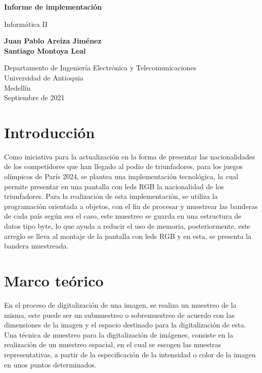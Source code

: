\documentclass{article}
\begin{document}
\begin{titlepage}
    \begin{center}
        \vspace*{1cm}
            
        \Huge
        \textbf{Informe de implementación}
            
        \vspace{0.5cm}
        \LARGE
        Informática II
            
        \vspace{1.5cm}
            
        \textbf{Juan Pablo Areiza Jiménez\\Santiago Montoya Leal}
            
        \vfill
            
        \vspace{0.8cm}
            
        \Large
        Departamento de Ingeniería Electrónica y Telecomunicaciones\\
        Universidad de Antioquia\\
        Medellín\\
        Septiembre de 2021
            
    \end{center}
\end{titlepage}

\tableofcontents
\newpage
\section{Introducción}\label{intro}
Como iniciativa para la actualización en la forma de presentar las nacionalidades de los competidores que han llegado al podio de triunfadores, para los juegos olímpicos de París 2024, se plantea una implementación tecnológica, la cual permite presentar en una pantalla con leds RGB la nacionalidad de los triunfadores. Para la realización de esta implementación, se utiliza la programación orientada a objetos, con el fin de procesar y muestrear las banderas de cada país según sea el caso, este muestreo se guarda en una estructura de datos tipo byte, lo que ayuda a reducir el uso de memoria, posteriormente, este arreglo se lleva al montaje de la pantalla con leds RGB y en esta, se presenta la bandera muestreada.
\section{Marco teórico} \label{mt}
En el proceso de digitalización de una imagen, se realiza un muestreo de la misma, este puede ser un submuestreo o sobremuestreo de acuerdo con las dimensiones de la imagen y el espacio destinado para la digitalización de esta. Una técnica de muestreo para la digitalización de imágenes, consiste en la realización de un muestreo espacial, en el cual se escogen las muestras representativas, a partir de la especificación de la intensidad o color de la imagen en unos puntos determinados. 
\end{document}

